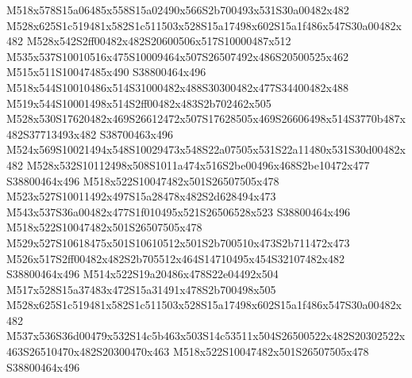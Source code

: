 \documentclass{article}
\begin{document}
\begin{multicols}{2}
M518x578S15a06485x558S15a02490x566S2b700493x531S30a00482x482 M528x625S1c519481x582S1c511503x528S15a17498x602S15a1f486x547S30a00482x482 M528x542S2ff00482x482S20600506x517S10000487x512 M535x537S10010516x475S10009464x507S26507492x486S20500525x462 M515x511S10047485x490 S38800464x496 M518x544S10010486x514S31000482x488S30300482x477S34400482x488 M519x544S10001498x514S2ff00482x483S2b702462x505 M528x530S17620482x469S26612472x507S17628505x469S26606498x514S3770b487x482S37713493x482 S38700463x496 M524x569S10021494x548S10029473x548S22a07505x531S22a11480x531S30d00482x482 M528x532S10112498x508S1011a474x516S2be00496x468S2be10472x477 S38800464x496 M518x522S10047482x501S26507505x478 M523x527S10011492x497S15a28478x482S2d628494x473 M543x537S36a00482x477S1f010495x521S26506528x523 S38800464x496 M518x522S10047482x501S26507505x478 M529x527S10618475x501S10610512x501S2b700510x473S2b711472x473 M526x517S2ff00482x482S2b705512x464S14710495x454S32107482x482 S38800464x496 M514x522S19a20486x478S22e04492x504 M517x528S15a37483x472S15a31491x478S2b700498x505 M528x625S1c519481x582S1c511503x528S15a17498x602S15a1f486x547S30a00482x482 M537x536S36d00479x532S14c5b463x503S14c53511x504S26500522x482S20302522x463S26510470x482S20300470x463 M518x522S10047482x501S26507505x478 S38800464x496









\end{multicols}
\end{document}
